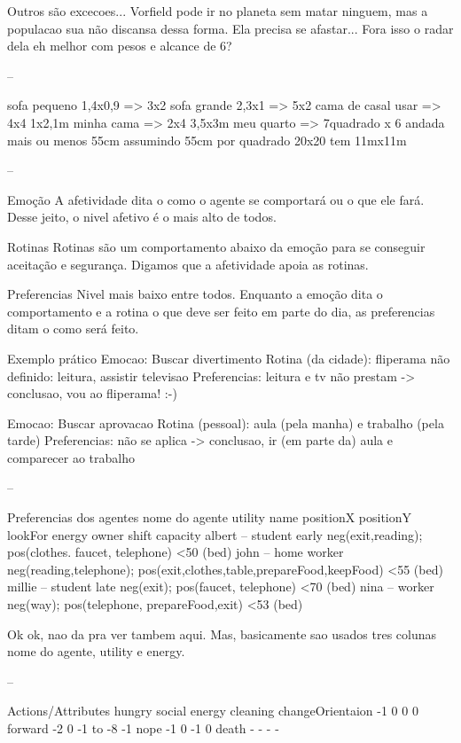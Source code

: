 Outros são excecoes... Vorfield pode ir no planeta
sem matar ninguem, mas a populacao sua não discansa
dessa forma. Ela precisa se afastar... Fora isso o radar dela
 eh melhor com pesos e alcance de 6?

--

sofa pequeno 1,4x0,9 => 3x2
sofa grande 2,3x1 => 5x2
cama de casal usar => 4x4
1x2,1m minha cama => 2x4
3,5x3m meu quarto => 7quadrado x 6
andada mais ou menos 55cm
assumindo 55cm por quadrado
20x20 tem 11mx11m

--

Emoção
	A afetividade dita o como o agente se comportará ou o que ele fará.
	Desse jeito, o nivel afetivo é o mais alto de todos.

Rotinas
	Rotinas são um comportamento abaixo da emoção para se conseguir
	aceitação e segurança. Digamos que a afetividade apoia as rotinas.

Preferencias
	Nivel mais baixo entre todos. Enquanto a emoção dita o comportamento
	e a rotina o que deve ser feito em parte do dia, as preferencias ditam o
como será feito.

Exemplo prático	
	Emocao: Buscar divertimento
	Rotina (da cidade): fliperama
	não definido: leitura, assistir televisao
	Preferencias: leitura e tv não prestam
	 -> conclusao, vou ao fliperama! :-)

	Emocao: Buscar aprovacao
	Rotina (pessoal): aula (pela manha) e trabalho (pela tarde)
	Preferencias: não se aplica
	 -> conclusao, ir (em parte da) aula e comparecer ao trabalho

--

Preferencias dos agentes
nome do agente	utility	name	positionX	positionY	lookFor	energy	owner
shift	capacity
albert – student early	neg(exit,reading); pos(clothes. faucet, telephone)
<50 (bed)			
john – home worker	neg(reading,telephone);
pos(exit,clothes,table,prepareFood,keepFood)					<55 (bed)			
millie – student late	neg(exit); pos(faucet, telephone)
<70 (bed)			
nina – worker	neg(way); pos(telephone, prepareFood,exit)
<53 (bed)			

Ok ok, nao da pra ver tambem aqui. Mas, basicamente sao usados tres colunas
nome do agente, utility e energy.

--

Actions/Attributes	hungry	social	energy	cleaning
changeOrientaion	  -1      0        0       0
forward				  -2      0    -1 to -8	  -1
nope				  -1      0       -1       0
death				   -      -        -       -

